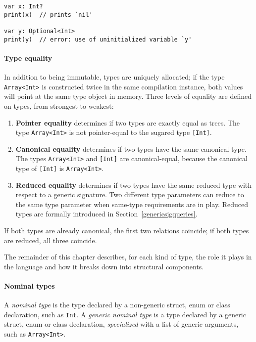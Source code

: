 \documentclass[a4paper,headsepline,bibliography=totoc,toc=flat,fleqn,twoside=semi]{scrbook}
\theoremstyle{definition}
\theoremstyle{definition}
\theoremstyle{definition}
\begin{document}
\begin{listing}\label{optional initialization}
\begin{Verbatim}
var x: Int?
print(x)  // prints `nil'

var y: Optional<Int>
print(y)  // error: use of uninitialized variable `y'
\end{Verbatim}
\end{listing}
 
\paragraph{Type equality} In addition to being immutable, types are uniquely allocated; if the type \texttt{Array<Int>} is constructed twice in the same compilation instance, both values will point at the same type object in memory. Three levels of equality are defined on types, from strongest to weakest:
\begin{enumerate}
\item \textbf{Pointer equality} determines if two types are exactly equal as trees. The type \texttt{Array<Int>} is not pointer-equal to the sugared type \texttt{[Int]}.
\item \textbf{Canonical equality} determines if two types have the same canonical type. The types \texttt{Array<Int>} and \texttt{[Int]} are canonical-equal, because the canonical type of \texttt{[Int]} is \texttt{Array<Int>}.
\item \textbf{Reduced equality} determines if two types have the same reduced type with respect to a generic signature. Two different type parameters can reduce to the same type parameter when same-type requirements are in play. Reduced types are formally introduced in Section~\ref{genericsigqueries}.
\end{enumerate}
If both types are already canonical, the first two relations coincide; if both types are reduced, all three coincide.

The remainder of this chapter describes, for each kind of type, the role it plays in the language and how it breaks down into structural components.

\paragraph{Nominal types}
A \emph{nominal type} is the type declared by a non-generic struct, enum or class declaration, such as \texttt{Int}. A \emph{generic nominal type} is a type declared by a generic struct, enum or class declaration, \emph{specialized} with a list of generic arguments, such as \texttt{Array<Int>}.
\end{document}
